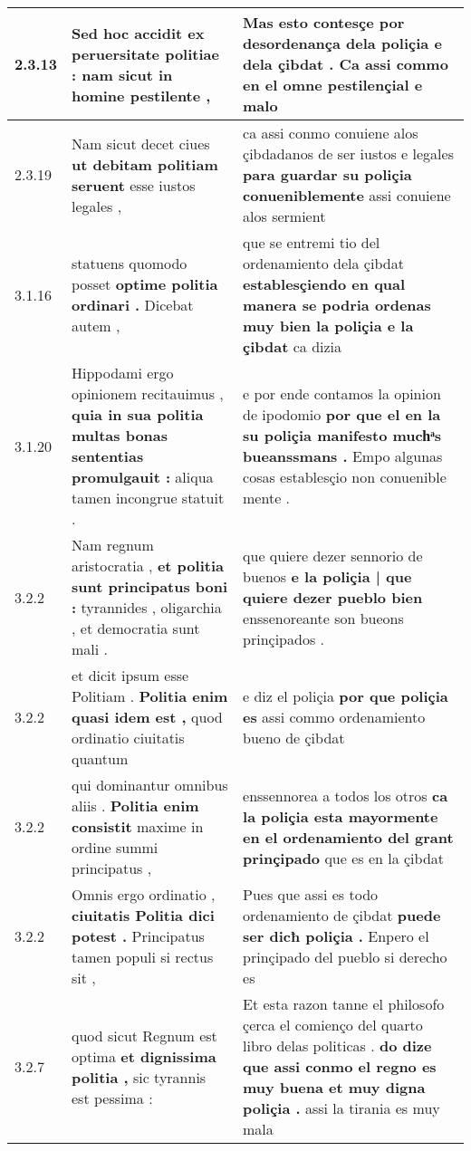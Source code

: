 \begin{tabular}{|p{1cm}|p{6.5cm}|p{6.5cm}|}

\hline
2.3.13 & Sed hoc accidit \textbf{ ex peruersitate politiae : } nam sicut in homine pestilente , & Mas esto contesçe \textbf{ por desordenança dela poliçia e dela çibdat . } Ca assi commo en el omne pestilençial e malo \\\hline
2.3.19 & Nam sicut decet ciues \textbf{ ut debitam politiam seruent } esse iustos legales , & ca assi conmo conuiene alos çibdadanos de ser iustos e legales \textbf{ para guardar su poliçia conueniblemente } assi conuiene alos sermient \\\hline
3.1.16 & statuens quomodo posset \textbf{ optime politia ordinari . } Dicebat autem , & que se entremi tio del ordenamiento dela çibdat \textbf{ establesçiendo en qual manera se podria ordenas muy bien la poliçia e la çibdat } ca dizia \\\hline
3.1.20 & Hippodami ergo opinionem recitauimus , \textbf{ quia in sua politia multas bonas sententias promulgauit : } aliqua tamen incongrue statuit . & e por ende contamos la opinion de ipodomio \textbf{ por que el en la su poliçia manifesto muchͣs bueanssmans . } Empo algunas cosas establesçio non conuenible mente . \\\hline
3.2.2 & Nam regnum aristocratia , \textbf{ et politia sunt principatus boni : } tyrannides , oligarchia , et democratia sunt mali . & que quiere dezer sennorio de buenos \textbf{ e la poliçia | que quiere dezer pueblo bien } enssenoreante son bueons prinçipados . \\\hline
3.2.2 & et dicit ipsum esse Politiam . \textbf{ Politia enim quasi idem est , } quod ordinatio ciuitatis quantum & e diz el poliçia \textbf{ por que poliçia es } assi commo ordenamiento bueno de çibdat \\\hline
3.2.2 & qui dominantur omnibus aliis . \textbf{ Politia enim consistit } maxime in ordine summi principatus , & enssennorea a todos los otros \textbf{ ca la poliçia esta mayormente en el ordenamiento del grant prinçipado } que es en la çibdat \\\hline
3.2.2 & Omnis ergo ordinatio , \textbf{ ciuitatis Politia dici potest . } Principatus tamen populi si rectus sit , & Pues que assi es todo ordenamiento de çibdat \textbf{ puede ser dicħ poliçia . } Enpero el prinçipado del pueblo si derecho es \\\hline
3.2.7 & quod sicut Regnum est optima \textbf{ et dignissima politia , } sic tyrannis est pessima : & Et esta razon tanne el philosofo çerca el comienço del quarto libro delas politicas . \textbf{ do dize que assi conmo el regno es muy buena et muy digna poliçia . } assi la tirania es muy mala \\\hline

\end{tabular}
